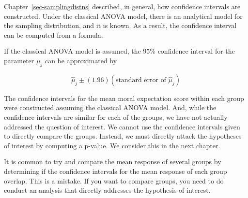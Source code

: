 \documentclass[
  letterpaper,
  DIV=11,
  numbers=noendperiod]{scrreprt}
\theoremstyle{definition}
\theoremstyle{definition}
\theoremstyle{plain}
\theoremstyle{remark}
\begin{document}
Chapter~\ref{sec-samplingdistns} described, in general, how confidence
intervals are constructed. Under the classical ANOVA model, there is an
analytical model for the sampling distribution, and it is known. As a
result, the confidence interval can be computed from a formula.

\begin{tcolorbox}[enhanced jigsaw, colbacktitle=quarto-callout-note-color!10!white, colback=white, left=2mm, title=\textcolor{quarto-callout-note-color}{\faInfo}\hspace{0.5em}{Formula for Confidence Interval Under Classical ANOVA Model}, toptitle=1mm, leftrule=.75mm, breakable, bottomrule=.15mm, arc=.35mm, rightrule=.15mm, toprule=.15mm, coltitle=black, opacityback=0, colframe=quarto-callout-note-color-frame, opacitybacktitle=0.6, bottomtitle=1mm, titlerule=0mm]

If the classical ANOVA model is assumed, the 95\% confidence interval
for the parameter \(\mu_j\) can be approximated by

\[\widehat{\mu}_j \pm (1.96) \left(\text{standard error of } \widehat{\mu}_j\right)\]

\end{tcolorbox}

The confidence intervals for the mean moral expectation score within
each group were constructed assuming the classical ANOVA model. And,
while the confidence intervals are similar for each of the groups, we
have not actually addressed the question of interest. We cannot use the
confidence intervals given to directly compare the groups. Instead, we
must directly attack the hypotheses of interest by computing a p-value.
We consider this in the next chapter.

\begin{tcolorbox}[enhanced jigsaw, colbacktitle=quarto-callout-warning-color!10!white, colback=white, left=2mm, title=\textcolor{quarto-callout-warning-color}{\faExclamationTriangle}\hspace{0.5em}{Warning}, toptitle=1mm, leftrule=.75mm, breakable, bottomrule=.15mm, arc=.35mm, rightrule=.15mm, toprule=.15mm, coltitle=black, opacityback=0, colframe=quarto-callout-warning-color-frame, opacitybacktitle=0.6, bottomtitle=1mm, titlerule=0mm]

It is common to try and compare the mean response of several groups by
determining if the confidence intervals for the mean response of each
group overlap. This is a mistake. If you want to compare groups, you
need to do conduct an analysis that directly addresses the hypothesis of
interest.

\end{tcolorbox}
\end{document}
